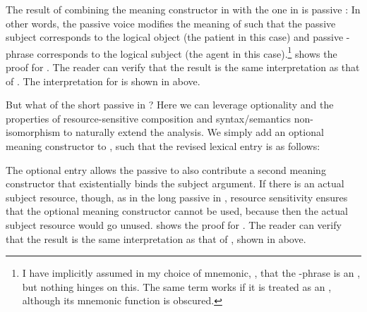 \documentclass[output=paper,hidelinks]{langscibook}
\begin{document}
The result of combining the meaning constructor in 
with the one in  is passive : 
\ea \label{ex:hug-lex-pass} 
  \z
  In other words, the passive voice modifies the meaning of
   such that the passive subject corresponds to the
  logical object (the patient in this case) and passive
  -phrase corresponds to the logical subject (the agent in
  this case).\footnote{I have implicitly assumed in my choice of
    mnemonic, , that the -phrase is an
    , but nothing hinges on this. The same term works if
    it is treated as an , although its mnemonic function
    is obscured.}  shows the proof for
  . The reader can verify that the result is
  the same interpretation as that of . The
  interpretation for  is shown in
   above.

\begin{sloppypar}
  But what of the short passive in ? Here
  we can leverage optionality and the properties of resource-sensitive
  composition and syntax/semantics non-isomorphism to naturally extend
  the analysis. We simply add an optional meaning constructor to
  , such that the revised lexical entry is as
  follows:
\end{sloppypar}
\ea
\label{ex:passive-lex2} 
\z
%
The optional entry allows the passive to also contribute a second
meaning constructor that existentially binds the subject argument. If
there is an actual subject resource, though, as in the long passive in
, resource sensitivity ensures that the
optional meaning constructor cannot be used, because then the actual
subject resource would go unused.  shows
  the proof for . The reader can verify that
  the result is the same interpretation as that of
  , shown in
   above. 
\end{document}
